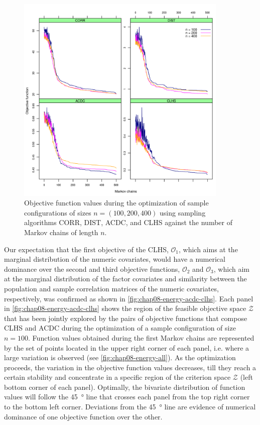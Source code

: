 \begin{figure}[!ht]
 \centering
 \includegraphics[width=0.90\textwidth]{fig/chap08-energy-corr-dist-acdc-clhs}
\caption[Objective function values during the optimization of three sample configurations using four sampling 
algorithms.]{Objective function values during the optimization of sample configurations of sizes $n = (100, 
200, 400)$ using sampling algorithms CORR, DIST, ACDC, and CLHS against the number of Markov chains of length 
$n$.}
\label{fig:chap08-energy-all}
\end{figure}

Our expectation that the first objective of the CLHS, $\mathcal{O}_1$, which aims at the marginal distribution 
of the numeric covariates, would have a numerical dominance over the second and third objective functions, 
$\mathcal{O}_2$ and $\mathcal{O}_3$, which aim at the marginal distribution of the factor covariates and 
similarity between the population and sample correlation matrices of the numeric covariates, respectively, was 
confirmed as shown in \autoref{fig:chap08-energy-acdc-clhs}. Each panel in 
\autoref{fig:chap08-energy-acdc-clhs} shows the region of the feasible objective space $\mathcal{Z}$ that has 
been jointly explored by the pairs of objective functions that compose CLHS and ACDC during the optimization of 
a sample configuration of size $n = 100$. Function values obtained during the first Markov chains are 
represented by the set of points located in the upper right corner of each panel, i.e. where a large variation 
is observed (see \autoref{fig:chap08-energy-all}). As the optimization proceeds, the variation in the objective 
function values decreases, till they reach a certain stability and concentrate in a specific region of the 
criterion space $\mathcal{Z}$ (left bottom corner of each panel). Optimally, the bivariate distribution of 
function values will follow the \SI{45}{\degree} line that crosses each panel from the top right corner to the 
bottom left corner. Deviations from the \SI{45}{\degree} line are evidence of numerical dominance of one 
objective function over the other.


